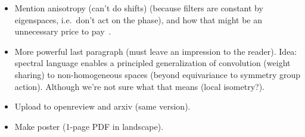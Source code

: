 \begin{itemize}
    \item Mention anisotropy (can't do shifts) (because filters are constant by eigenspaces, i.e.\ don't act on the phase), and how that might be an unnecessary price to pay~\cite{defferrard2020deepsphere}.
    \item More powerful last paragraph (must leave an impression to the reader). Idea: spectral language enables a principled generalization of convolution (weight sharing) to non-homogeneous spaces (beyond equivariance to symmetry group action). Although we're not sure what that means (local isometry?).
    \item Upload to openreview and arxiv (same version).
    \item Make poster (1-page PDF in landscape).
\end{itemize}
\clearpage
